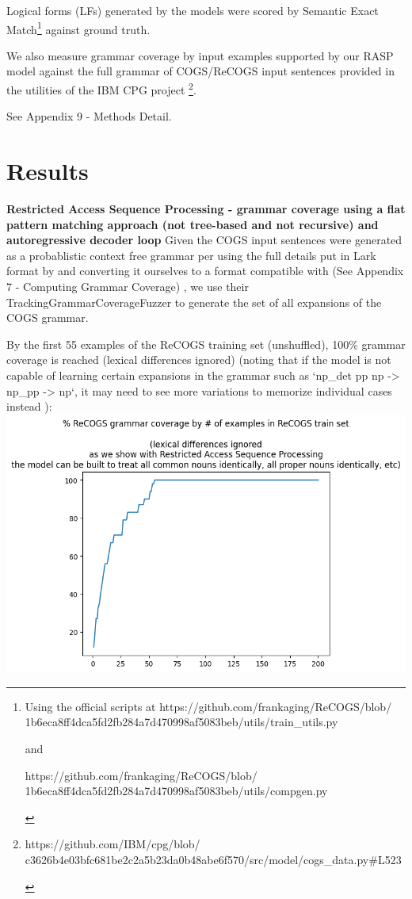 \documentclass[11pt]{article}
\begin{document}
Logical forms (LFs) generated by the models were scored by Semantic Exact Match\footnote{
\begin{tiny}
Using the official scripts at https://github.com/frankaging/ReCOGS/blob/
1b6eca8ff4dca5fd2fb284a7d470998af5083beb/utils/train\_utils.py

and

https://github.com/frankaging/ReCOGS/blob/
1b6eca8ff4dca5fd2fb284a7d470998af5083beb/utils/compgen.py
\end{tiny}
} against ground truth.

We also measure grammar coverage by input examples supported by our RASP model against the full grammar of COGS/ReCOGS input sentences provided in the utilities of the IBM CPG project \cite{klinger2024compositionalprogramgenerationfewshot}\footnote{
\begin{tiny}
https://github.com/IBM/cpg/blob/
c3626b4e03bfc681be2c2a5b23da0b48abe6f570/src/model/cogs\_data.py\#L523 
\end{tiny}
}.

See Appendix 9 - Methods Detail.
\section{Results}
\textbf{Restricted Access Sequence Processing - grammar coverage using a flat pattern matching approach (not tree-based and not recursive) and autoregressive decoder loop}
Given the COGS input sentences were generated as a probablistic context free grammar per \cite{KimLinzen2020} 
using the full details put in Lark format by \cite{klinger2024compositionalprogramgenerationfewshot}
and converting it ourselves to a format compatible with \cite{fuzzingbook2023:GrammarCoverageFuzzer} (See Appendix 7 - Computing Grammar Coverage) , we use their TrackingGrammarCoverageFuzzer to generate the set of all expansions of the COGS grammar.

By the first 55 examples of the ReCOGS training set (unshuffled), 100\% grammar coverage is reached (lexical differences ignored) \cite{fuzzingbook2023:GrammarCoverageFuzzer} (noting that if the model is not capable of learning certain expansions in the grammar such as `np\_det pp np -> np\_pp -> np`, it may need to see more variations to memorize individual cases instead ):
\includegraphics[scale=0.40]{grammar_coverage_by_number_of_recogs_training_examples_lexical_differences_ignored.png}
\end{document}
